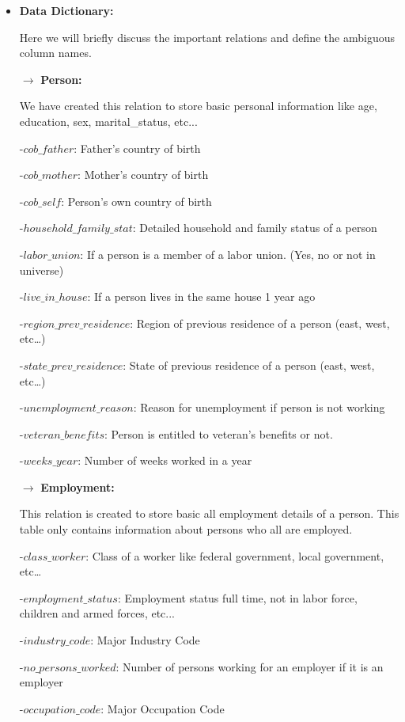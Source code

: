 \documentclass[9pt, twocolumn]{article}
\begin{document}
\begin{enumerate}
\begin{itemize}
	\item \textbf{Data Dictionary:}
		\par Here we will briefly discuss the important relations and define the ambiguous column names.\\
			\par $\rightarrow$ \textbf{Person:}
		\par We have created this relation to store basic personal information like age, education, sex, marital\_status, etc...\\
		\par -$cob\_father$:  Father’s country of birth
		\par -$cob\_mother$: Mother’s country of birth
		\par -$cob\_self$: Person’s own country of birth
		\par -$household\_family\_stat$: Detailed household and family status of a person
		\par -$labor\_union$: If a person is a member of a labor union. (Yes, no or not in universe)
		\par -$live\_in\_house$: If a person lives in the same house 1 year ago
		\par -$region\_prev\_residence$: Region of previous residence of a person (east, west, etc…)
		\par -$state\_prev\_residence$: State of previous residence of a person (east, west, etc…)
		\par -$unemployment\_reason$: Reason for unemployment if person is not working
		\par -$veteran\_benefits$: Person is entitled to veteran’s benefits or not.
		\par -$weeks\_year$: Number of weeks worked in a year\\
		
			\par $\rightarrow$ \textbf{Employment:}
		\par This relation is created to store basic all employment details of a person. This table only contains information about persons who all are employed.\\
		\par -$class\_worker$: Class of a worker like federal government, local government, etc…
		\par -$employment\_status$: Employment status full time, not in labor force, children and armed forces, etc...
		\par -$industry\_code$: Major Industry Code
		\par -$no\_persons\_worked$: Number of persons working for an employer if it is an employer
		\par -$occupation\_code$: Major Occupation Code\\



\end{itemize}
\end{enumerate}
\end{document}
